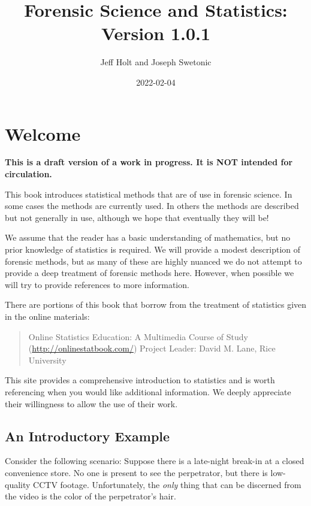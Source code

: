 \documentclass[
]{book}
\title{Forensic Science and Statistics: Version 1.0.1}
\author{Jeff Holt and Joseph Swetonic}
\date{2022-02-04}
\begin{document}
\maketitle

{
\setcounter{tocdepth}{1}
\tableofcontents
}
\hypertarget{welcome}{%
\chapter{Welcome}\label{welcome}}

\textbf{This is a draft version of a work in progress. It is NOT intended for circulation.}

This book introduces statistical methods that are of use in forensic science.
In some cases the methods are currently used.
In others the methods are described but not generally in use,
although we hope that eventually they will be!

We assume that the reader has a basic understanding of mathematics, but no prior
knowledge of statistics is required.
We will provide a modest description of forensic methods, but as many of these are
highly nuanced we do not attempt to
provide a deep treatment of forensic methods here. However, when possible we will
try to provide references to more information.

There are portions of this book that borrow from the treatment of statistics
given in the online materials:

\begin{quote}
Online Statistics Education: A Multimedia Course of Study (\url{http://onlinestatbook.com/})
Project Leader: David M. Lane, Rice University
\end{quote}

This site provides a comprehensive introduction to statistics and is worth referencing when you would like additional information.
We deeply appreciate their willingness to allow the use of their work.

\hypertarget{an-introductory-example}{%
\section{An Introductory Example}\label{an-introductory-example}}

Consider the following scenario:
Suppose there is a late-night break-in at a closed convenience store.
No one is present to see the perpetrator, but there is low-quality CCTV footage.
Unfortunately, the \emph{only} thing that can be discerned from the video is the
color of the perpetrator's hair.
\end{document}
